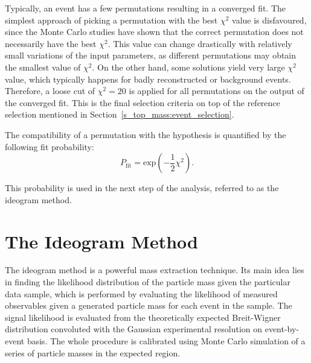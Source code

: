 Typically, an event has a few permutations resulting in a converged fit. The simplest approach of picking a permutation
with the best $\chi^2$ value is disfavoured, since the Monte Carlo studies have shown that the correct permutation
does not necessarily have the best $\chi^2$. This value can change drastically with relatively small variations of the
input parameters, as different permutations may obtain the smallest value of $\chi^2$. On the other hand, some solutions
yield very large $\chi^2$ value, which typically happens for badly reconstructed or background events. Therefore, a
loose cut of $\chi^2=20$ is applied for all permutations on the output of the converged fit. This is the final
selection criteria on top of the reference selection mentioned in Section~\ref{s_top_mass:event_selection}.


The compatibility of a permutation with the \ttbar hypothesis is quantified by the following fit probability:
\begin{equation}
	P_{\textrm{fit}} = \textrm{exp}(-\frac{1}{2}\chi^2).
	\label{eq:fit_probability}
\end{equation}

This probability is used in the next step of the analysis, referred to as the ideogram method.

\section{The Ideogram Method}
\label{s_top_mass:ideogram_method}
The ideogram method is a powerful mass extraction technique. Its main idea lies in finding the likelihood distribution
of the particle mass given the particular data sample, which is performed by evaluating the likelihood of measured
observables given a generated particle mass for each event in the sample. The signal likelihood is evaluated from the
theoretically expected Breit-Wigner distribution convoluted with the Gaussian experimental resolution on event-by-event
basis. The whole procedure is calibrated using Monte Carlo simulation of a series of particle masses in the expected
region.


